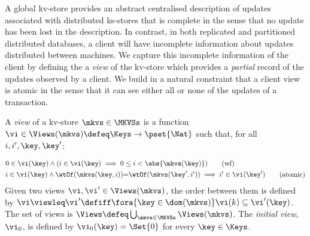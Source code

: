 A global kv-store provides an abstract centralised description of
updates associated with distributed ks-stores that is complete in the
sense that no update has been lost in the description. In contrast, in
both replicated and partitioned distributed databases, a client will
have incomplete information about updates distributed between
machines.  We capture this incomplete information of the client by
defining the a {\em view} of the kv-store which provides a {\em
  partial} record of the updates observed by a client. We build in a
natural constraint that a client view is {atomic} in the sense that it can
see either all or none of the updates of a transaction.



\begin{definition}[Views]
\label{def:view}
\label{def:cuts}
\label{def:views}
\label{def:configuration}
A \emph{view} of a kv-store $\mkvs \in \MKVSs$ is a function
$\vi \in \Views(\mkvs) \defeq \Keys \to\pset{\Nat}$ such that, for all $i, i', \key, \key'$:
%

\vspace{-5pt}
{%
\displaymathfont
\begin{align*}
    & 
    0 \in \vi(\key) 
    \land (i \in \vi(\key) \implies 0 \leq i < \abs{ \mkvs(\key) }) 
    \tag{wf}
    \label{eq:view.wf}\\
    & 
    \begin{array}{@{}l@{}}
	i \in \vi(\key)  
  	\land \wtOf(\mkvs(\key, i)) {=} \wtOf(\mkvs(\key', i'))  
  	\implies i' \in \vi(\key')
    \end{array}
	\tag{atomic}
	\label{eq:view.atomic}
\end{align*}
}%
Given two views $\vi, \vi' \in \Views(\mkvs)$, 
the order between them is defined by $\vi \viewleq \vi' \defiff \fora{\key \in \dom(\mkvs)} \vi(k) \subseteq \vi'(\key)$.
The set of views is $\Views \defeq \bigcup_{\mkvs \in \MKVSs} \Views(\mkvs)$.
%
\noindent The \emph{initial view}, $\vi_{0}$,  is defined by
$\vi_{0}(\key) = \Set{0}$ for every $\key \in \Keys$. 
\end{definition}

